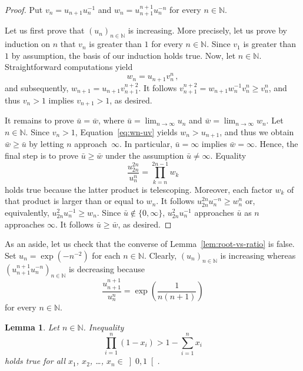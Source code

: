 \documentclass[12pt]{article}
\newcommand{\bN}{\mathbb{N}} %
\newtheorem{lemma}{Lemma}
\begin{document}
\begin{proof}
 Put
  $v_n = u_{n + 1} u_n^{-1}$
  and
  $w_n = u_{n + 1}^{n + 1} u_n^{- n}$
  for every $n \in \bN$.
  
  Let us first prove that $\left( u_n \right)_{n \in \bN}$ is increasing.
  More precisely, let us prove by induction on $n$ that $v_n$ is greater than $1$ for every $n \in \bN$.
  Since $v_1$ is greater than $1$ by assumption,
  the basis of our induction holds true.
  Now, let $n \in \bN$. %
  Straightforward computations yield
  \begin{equation} \label{eq:wn-uv}
    w_n = u_{n + 1}v_n^n \,, 
  \end{equation} 
  and subsequently, 
  $w_{n + 1} = u_{n + 1} v_{n + 1}^{n + 2}$.
  It follows  
  $v_{n + 1}^{n + 2}= w_{n + 1}w_n^{-1} v_n^n \ge v_n^n$,
  and thus $v_n > 1$ implies $v_{n + 1} > 1$, as desired.

  It remains to prove $\bar u = \bar w$, where 
  $\bar u = \lim_{n \to \infty} u_n$ and 
  $\bar w = \lim_{n \to \infty} w_n$.
  Let $n \in \bN$.
  Since $v_n > 1$,
  Equation~\eqref{eq:wn-uv} yields $w_n > u_{n + 1}$,
  and thus we obtain $\bar w \ge \bar u$ by letting $n$ approach~$\infty$.
  In particular, $\bar u = \infty$ implies $\bar w = \infty$.
  Hence, the final step is to prove $\bar u \ge \bar w$ under the assumption $\bar u \ne \infty$.
  Equality 
  $$
  \frac{u_{2n}^{2n}}{ u_n^n} =  \prod_{k = n}^{2n - 1} w_k
  $$
  holds true because the latter product is telescoping.
  Moreover, each factor $w_k$ of that product is larger than or equal to $w_n$.
  It follows 
  $u_{2n}^{2n} u_n^{-n} \ge w_n^n$ 
  or, equivalently,
  $u_{2n}^2u_n^{- 1}  \ge  w_n$.
  Since $\bar u \notin \{ 0, \infty \}$, 
  $u_{2n}^2 u_n^{-1}$ approaches $\bar u$ as $n$ approaches $\infty$.
  It follows $\bar u \ge \bar w$, as desired.
\end{proof}

As an aside, let us check that the converse of Lemma~\ref{lem:root-vs-ratio} is false.
Set $ u_n = \exp \left( - n^{- 2} \right)$ for each $n \in \bN$.
Clearly,  $\left( u_n \right)_{n \in \bN}$  is increasing whereas
$\left(  u_{n + 1}^{n + 1}  u_n^{-n} \right)_{n \in \bN}$ is decreasing because 
$$
\frac{u_{n + 1}^{n + 1}}{u_n^n} = \exp \left(\frac{1}{n (n + 1)} \right) 
$$
for every $n \in \bN$.

\begin{lemma}
  Let $n \in \bN$.
  Inequality 
  $$
  \prod_{i = 1}^n (1 - x_i) > 1 - \sum_{i = 1}^n x_i 
  $$
  holds true for all  $x_1$, $x_2$, \dots, $x_n \in \left]0, 1\right[$. 
\end{lemma} 
\end{document}
